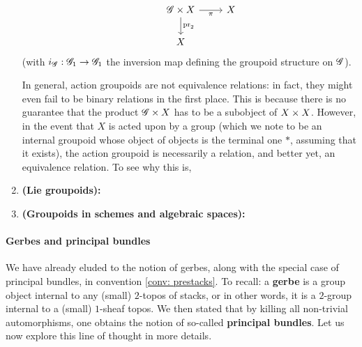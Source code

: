 \begin{example}
\begin{enumerate}
$$\begin{tikzcd}
                                                                                                                                                                & \scrG \x X \arrow[d, "\pr_2"] \arrow[r, "\pi"'] & X \\
                                                                                                                                                                & X                                               &  
                                    \end{tikzcd}
                                $$
                            (with $i_{\mathscr{G}}: \mathscr{G}_1 \to \mathscr{G}_1$ the inversion map defining the groupoid structure on $\mathscr{G}$). 
                            
                            In general, action groupoids are not equivalence relations: in fact, they might even fail to be binary relations in the first place. This is because there is no guarantee that the product $\scrG \x X$ has to be a subobject of $X \x X$. However, in the event that $X$ is acted upon by a group (which we note to be an internal groupoid whose object of objects is the terminal one $*$, assuming that it exists), the action groupoid is necessarily a relation, and better yet, an equivalence relation. To see why this is, 
                            \item \textbf{(Lie groupoids):}
                            \item \textbf{(Groupoids in schemes and algebraic spaces):} 
                        \end{enumerate}
                    \end{example}
                    
                \paragraph{Gerbes and principal bundles} \label{paragraph: principal_bundles}
                    We have already eluded to the notion of gerbes, along with the special case of principal bundles, in convention \ref{conv: prestacks}. To recall: a \textbf{gerbe} is a group object internal to any (small) $2$-topos of stacks, or in other words, it is a $2$-group internal to a (small) $1$-sheaf topos. We then stated that by killing all non-trivial automorphisms, one obtains the notion of so-called \textbf{principal bundles}. Let us now explore this line of thought in more details.
                    
